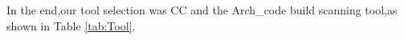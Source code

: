 \documentclass[sigconf,screen,review,anonymous]{acmart}
\begin{document}
In the end,our tool selection was CC and the Arch\_code build scanning tool,as shown in Table \ref{tab:Tool}.






\end{document}
